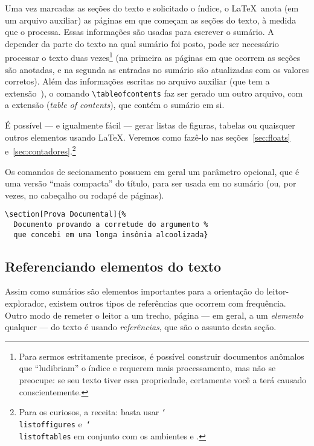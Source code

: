Uma vez marcadas as seções do texto e solicitado o índice, o
\LaTeX\ anota (em um arquivo auxiliar) as páginas em que começam as
seções do texto, à medida que o processa. Essas informações
são usadas para escrever o sumário. A depender da parte do
texto na qual sumário foi posto, pode ser necessário processar o texto duas vezes\footnote{Para sermos estritamente precisos, é possível construir documentos anômalos que ``ludibriam'' o índice e requerem mais processamento, mas não se preocupe: se seu texto tiver essa propriedade, certamente você a terá causado conscientemente.} (na primeira as páginas em que ocorrem as seções são anotadas, e
na segunda as entradas no sumário são atualizadas com os valores
corretos).
Além das informações escritas no arquivo auxiliar (que tem a
extensão~), o comando \verb'\tableofcontents' faz ser
gerado um outro arquivo, com a extensão  (\emph{table of
  contents}), que contém o sumário em si. 

É possível --- e igualmente fácil --- gerar listas de figuras, tabelas
ou quaisquer outros elementos usando \LaTeX. Veremos como fazê-lo nas
seções~\ref{sec:floats} e~\ref{sec:contadores}.\footnote{Para os
  curiosos, a receita: basta usar  \texttt{\char`\\{}listoffigures}
  e~\texttt{\char`\\{}listoftables} em conjunto com os ambientes
   e .}


Os comandos de secionamento possuem em geral um parâmetro opcional,
que é uma versão ``mais compacta'' do título, para ser usada em no
sumário (ou, por vezes, no cabeçalho ou rodapé de páginas).
\begin{footnotesize}
\begin{verbatim}
\section[Prova Documental]{%
  Documento provando a corretude do argumento %
  que concebi em uma longa insônia alcoolizada}
\end{verbatim}
\end{footnotesize}


\subsection{Referenciando elementos do texto}

Assim como sumários são elementos importantes para a orientação do leitor-explorador, existem outros tipos de referências que ocorrem com frequência. Outro modo de remeter o leitor a um trecho, página --- em geral, a um \emph{elemento} qualquer --- do texto é usando \emph{referências}, que são o assunto desta seção.

